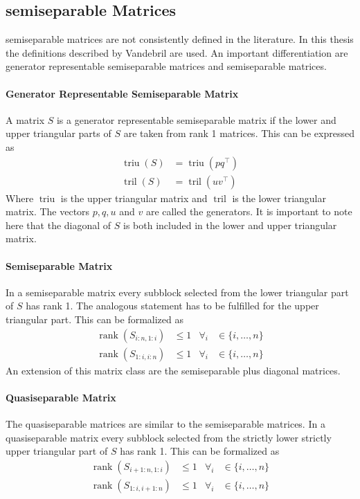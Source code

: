 \documentclass[doctype=mastersthesis,BCOR=15mm,biblatex]{ldvbook}%
\DeclareMathOperator{\rank}{rank}
\DeclareMathOperator{\triu}{triu}
\DeclareMathOperator{\tril}{tril}
\begin{document}
\subsection{semiseparable Matrices}
semiseparable matrices are not consistently defined in the literature. 
In this thesis the definitions described by Vandebril \cite{vandebril_bibliography_2005,vandebril_matrix_2007} are used.
An important differentiation are generator representable semiseparable matrices and semiseparable matrices.
\paragraph{Generator Representable Semiseparable Matrix}
A matrix $S$ is a generator representable semiseparable matrix if the lower and upper triangular parts of $S$ are taken from rank 1 matrices.
This can be expressed as 
\begin{align}
	\triu(S) &= \triu(pq^\top)\\
	\tril(S) &= \tril(uv^\top)
\end{align}
Where $\triu$ is the upper triangular matrix and $\tril$ is the lower triangular matrix. The vectors $p,q,u$ and $v$ are called the generators.
It is important to note here that the diagonal of $S$ is both included in the lower and upper triangular matrix.

\paragraph{Semiseparable Matrix}
In a semiseparable matrix every subblock selected from the lower triangular part of $S$ has rank 1. The analogous statement has to be fulfilled for the upper triangular part.
This can be formalized as 
\begin{align}
	\rank(S_{i:n,1:i}) &\leq 1 & \forall_i &\in\{i,\dots,n\}\\
	\rank(S_{1:i,i:n}) &\leq 1 & \forall_i &\in\{i,\dots,n\}
\end{align}
An extension of this matrix class are the semiseparable plus diagonal matrices.

\paragraph{Quasiseparable Matrix}
The quasiseparable matrices are similar to the semiseparable matrices. In a quasiseparable matrix every subblock selected from the strictly lower strictly upper triangular part of $S$ has rank 1. 
This can be formalized as 
\begin{align}
\rank(S_{i+1:n,1:i}) &\leq 1 & \forall_i &\in\{i,\dots,n\}\\
\rank(S_{1:i,i+1:n}) &\leq 1 & \forall_i &\in\{i,\dots,n\}
\end{align}
\end{document}
